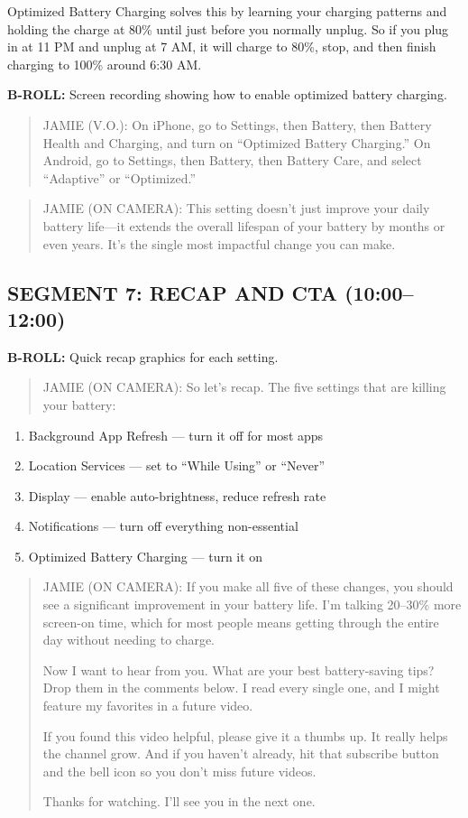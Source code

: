 \documentclass[
    language=english,
    doctype=video-script,
    institution=none,
]{../../omnilatex}
\begin{document}
Optimized Battery Charging solves this by learning your charging patterns and holding the charge at 80\% until just before you normally unplug. So if you plug in at 11 PM and unplug at 7 AM, it will charge to 80\%, stop, and then finish charging to 100\% around 6:30 AM.

\textbf{B-ROLL:} Screen recording showing how to enable optimized battery charging.

\begin{quote}
JAMIE (V.O.): On iPhone, go to Settings, then Battery, then Battery Health and Charging, and turn on ``Optimized Battery Charging.'' On Android, go to Settings, then Battery, then Battery Care, and select ``Adaptive'' or ``Optimized.''
\end{quote}

\begin{quote}
JAMIE (ON CAMERA): This setting doesn't just improve your daily battery life---it extends the overall lifespan of your battery by months or even years. It's the single most impactful change you can make.
\end{quote}

\subsection*{SEGMENT 7: RECAP AND CTA (10:00--12:00)}

\textbf{B-ROLL:} Quick recap graphics for each setting.

\begin{quote}
JAMIE (ON CAMERA): So let's recap. The five settings that are killing your battery:
\end{quote}

\begin{enumerate}
    \item Background App Refresh --- turn it off for most apps
    \item Location Services --- set to ``While Using'' or ``Never''
    \item Display --- enable auto-brightness, reduce refresh rate
    \item Notifications --- turn off everything non-essential
    \item Optimized Battery Charging --- turn it on
\end{enumerate}

\begin{quote}
JAMIE (ON CAMERA): If you make all five of these changes, you should see a significant improvement in your battery life. I'm talking 20--30\% more screen-on time, which for most people means getting through the entire day without needing to charge.

Now I want to hear from you. What are your best battery-saving tips? Drop them in the comments below. I read every single one, and I might feature my favorites in a future video.

If you found this video helpful, please give it a thumbs up. It really helps the channel grow. And if you haven't already, hit that subscribe button and the bell icon so you don't miss future videos.

Thanks for watching. I'll see you in the next one.
\end{quote}
\end{document}
